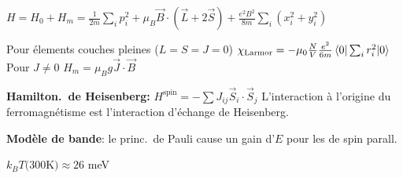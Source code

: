 \begin{squishlist}
    \item $H = H_0 + H_m = \frac{1}{2m}\sum_i p_i^2 + \mu_B \vec{B} \cdot (\vec{L}+ 2 \vec{S}) + \frac{e^2 B^2}{8m} \sum_i (x_i^2 + y_i^2)$
    \item Pour élements couches pleines ($L=S=J=0$) $\chi_{\text{Larmor}} = -\mu_0 \frac{N}{V} \frac{e^2}{6m} \braket{0|\sum_i r_i^2|0}$ \\
    Pour $J\neq0$ $H_m = \mu_B g \vec{J} \cdot \vec{B}$ 
    \item \textbf{Hamilton.\ de Heisenberg:} $H^{\text{spin}} = - \sum J_{ij} \vec{S}_i \cdot \vec{S}_j$  L’interaction à l’origine du ferromagnétisme est l’interaction d’échange de Heisenberg.
    \item \textbf{Modèle de bande}: le princ.\ de Pauli cause un gain d'$E$ pour les \elec de spin parall.\
\end{squishlist}

\begin{squishlist}
    \item $k_B T (300$K$) \approx 26$ meV
\end{squishlist}